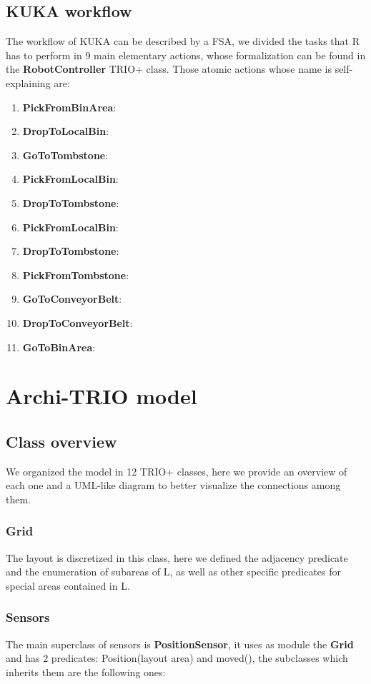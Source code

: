 \documentclass[a4paper]{article}
\begin{document}
\subsection{KUKA workflow}
The workflow of KUKA can be described by a FSA, we divided the tasks that R has to perform in 9 main elementary actions, whose formalization can be found in the \textbf{RobotController} TRIO+ class.
Those atomic actions whose name is self-explaining are:

\begin{enumerate}
    \item \textbf{PickFromBinArea}:\@ 
    \item \textbf{DropToLocalBin}:\@
    \item \textbf{GoToTombstone}:\@ 
    \item \textbf{PickFromLocalBin}:\@ 
    \item \textbf{DropToTombstone}:\@ 
    \item \textbf{PickFromLocalBin}:\@ 
    \item \textbf{DropToTombstone}:\@ 
    \item \textbf{PickFromTombstone}:\@ 
    \item \textbf{GoToConveyorBelt}:\@ 
    \item \textbf{DropToConveyorBelt}:\@ 
    \item \textbf{GoToBinArea}:\@ 
\end{enumerate}


\clearpage
\section{Archi-TRIO model}


\subsection{Class overview}
We organized the model in 12 TRIO+ classes, here we provide an overview of each one and a UML-like diagram to better visualize the connections among them.

\subsubsection{Grid}
The layout is discretized in this class, here we defined the adjacency predicate and the enumeration of subareas of L, as well as other specific predicates for special areas contained in L.

\subsubsection{Sensors}
The main superclass of sensors is \textbf{PositionSensor}, it uses as module the \textbf{Grid} and has 2 predicates: Position(layout area) and moved(), the subclasses which inherits them are the following ones:
\end{document}
